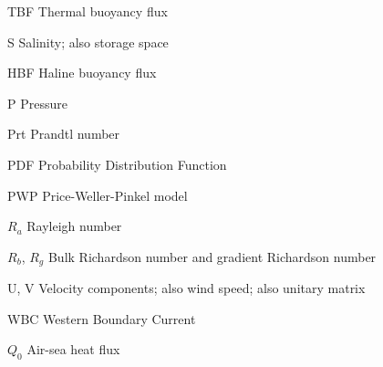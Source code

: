 \documentclass[a4paper,12pt, openright, titlepage]{book}
\begin{document}
\begin{abbrv}
\item[TBF]                   Thermal buoyancy flux\\
\item[S]                     Salinity; also storage space\\
\item[HBF]                   Haline buoyancy flux\\
\item[P]                     Pressure\\
\item[Prt]                   Prandtl number\\
\item[PDF]                   Probability Distribution Function\\
\item[PWP]                   Price-Weller-Pinkel model \citep{PWP}\\
\item[$R_{a}$]               Rayleigh number\\
\item[$R_{b}$, $R_{g}$]      Bulk Richardson number and gradient Richardson number\\
\item[U, V]                  Velocity components; also wind speed; also unitary matrix\\
\item[WBC]                   Western Boundary Current\\
\item[$Q_{0}$]               Air-sea heat flux\\
\end{abbrv}

\clearpage
\mainmatter

\linespread{1.5}

%
%
% 
%
%
%
%
%
% 
% 
%
%
%
%
\end{document}
